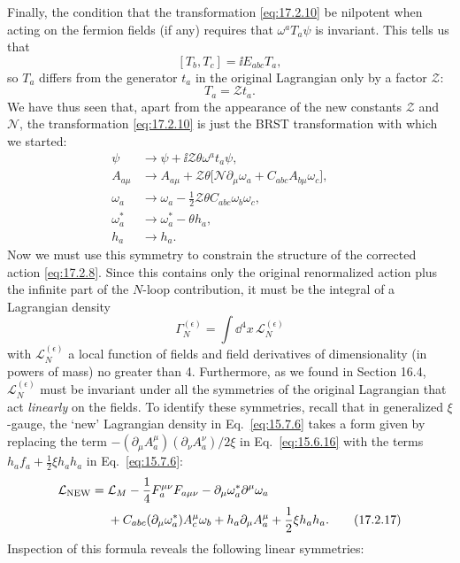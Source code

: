 Finally, the condition that the transformation \eqref{eq:17.2.10} be nilpotent when acting on the fermion fields (if any) requires that $\omega^a T_a\psi$ is invariant. This tells us that
\[
[T_b,T_c]=\ii E_{abc}T_a,
\]
so $T_a$ differs from the generator $t_a$ in the original Lagrangian only by a factor $\mathcal Z$:
\[
T_a=\mathcal Zt_a.
\]
We have thus seen that, apart from the appearance of the new constants $\mathcal Z$ and $\mathcal N$, the transformation \eqref{eq:17.2.10} is just the BRST transformation with which we started:
\begin{align}
\psi&\longrightarrow\psi+\ii\mathcal Z\theta\omega^a t_a\psi,
&&\tag{17.2.11}\label{eq:17.2.11}\\
A_{a\mu}&\longrightarrow A_{a\mu}
+\mathcal Z\theta\bigl[\mathcal N\partial_\mu\omega_a
+C_{abc}A_{b\mu}\omega_c\bigr],
&&\tag{17.2.12}\label{eq:17.2.12}\\
\omega_a&\longrightarrow\omega_a
-\frac12\mathcal Z\theta C_{abc}\omega_b\omega_c,
&&\tag{17.2.13}\label{eq:17.2.13}\\
\omega_a^*&\longrightarrow\omega_a^*-\theta h_a,
&&\tag{17.2.14}\label{eq:17.2.14}\\
h_a&\longrightarrow h_a.
&&\tag{17.2.15}\label{eq:17.2.15}
\end{align}
Now we must use this symmetry to constrain the structure of the corrected action \eqref{eq:17.2.8}. Since this contains only the original renormalized action plus the infinite part of the $N$-loop contribution, it must be the integral of a Lagrangian density
\begin{equation}
\Gamma_N^{(\epsilon)}=\int \dd^4x\,\mathcal L_N^{(\epsilon)}
\tag{17.2.16}\label{eq:17.2.16}
\end{equation}
with $\mathcal L_N^{(\epsilon)}$ a local function of fields and field derivatives of dimensionality (in powers of mass) no greater than 4. Furthermore, as we found in Section 16.4, $\mathcal L_N^{(\epsilon)}$ must be invariant under all the symmetries of the original Lagrangian that act \emph{linearly} on the fields. To identify these symmetries, recall that in generalized $\xi$-gauge, the `new' Lagrangian density in Eq.~\eqref{eq:15.7.6} takes a form given by replacing the term $-(\partial_\mu A_a^\mu)(\partial_\nu A_a^\nu)/2\xi$ in Eq.~\eqref{eq:15.6.16} with the terms $h_a f_a+\tfrac12\xi h_a h_a$ in Eq.~\eqref{eq:15.7.6}:
\begin{align}
\mathcal L_{\mathrm{NEW}}={}&\mathcal L_M
-\frac14F_a^{\mu\nu}F_{a\mu\nu}
-\partial_\mu\omega_a^*\partial^\mu\omega_a
\notag\\
&+C_{abc}(\partial_\mu\omega_a^*)A_c^\mu\omega_b
+h_a\partial_\mu A_a^\mu
+\frac12\xi h_a h_a.
\tag{17.2.17}\label{eq:17.2.17}
\end{align}
Inspection of this formula reveals the following linear symmetries:

